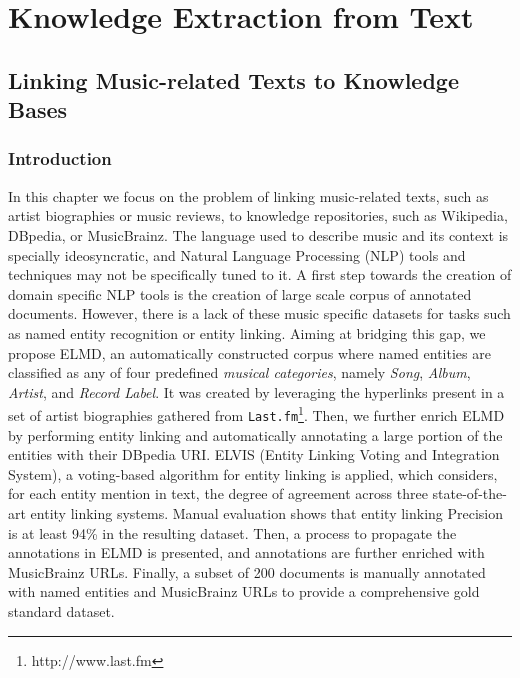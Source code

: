 \part{Knowledge Extraction from Text}
\label{part:knowledge-extraction}

\chapter[Linking Music-related Texts to Knowledge Bases][Linking Music-related Texts to KBs]{Linking Music-related Texts to Knowledge Bases}
\label{sec:linking}


\section{Introduction}
\label{sec:linking:intro}

In this chapter we focus on the problem of linking music-related texts, such as artist biographies or music reviews, to knowledge repositories, such as Wikipedia, DBpedia, or MusicBrainz. 
The language used to describe music and its context is specially ideosyncratic, and Natural Language Processing (NLP) tools and techniques may not be specifically tuned to it. A first step towards the creation of domain specific NLP tools is the creation of large scale corpus of annotated documents.
However, there is a lack of these music specific datasets for tasks such as named entity recognition or entity linking. Aiming at bridging this gap, we propose \textsc{ELMD}, an automatically constructed corpus where named entities are classified as any of four predefined \textit{musical categories}, namely \textit{Song}, \textit{Album}, \textit{Artist}, and \textit{Record Label}. It was created by leveraging the hyperlinks present in a set of artist biographies gathered from \texttt{Last.fm}\footnote{http://www.last.fm}. Then, we further enrich \textsc{ELMD} by performing entity linking and automatically annotating a large portion of the entities with their DBpedia URI. \textsc{ELVIS} (Entity Linking Voting and Integration System), a voting-based algorithm for entity linking is applied, which considers, for each entity mention in text, the degree of agreement across three state-of-the-art entity linking systems. 
Manual evaluation shows that entity linking Precision is at least 94\% in the resulting dataset.
Then, a process to propagate the annotations in \textsc{ELMD} is presented, and annotations are further enriched with MusicBrainz URLs.
Finally, a subset of 200 documents is manually annotated with named entities and MusicBrainz URLs to provide a comprehensive gold standard dataset. 

